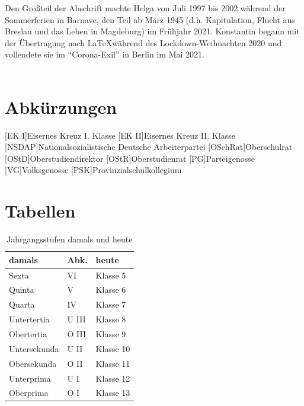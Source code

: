 \documentclass[a5paper,pagesize,10pt,twoside=true]{scrbook}
\begin{document}
Den Großteil der Abschrift machte Helga von Juli 1997 bis 2002 während der Sommerferien in Barnave, den Teil ab März 1945 (d.h. Kapitulation, Flucht aus Breslau und das Leben in Magdeburg) im Frühjahr 2021. Konstantin begann mit der Übertragung nach \LaTeX während des Lockdown-Weihnachten 2020 und vollendete sie im \enquote{Corona-Exil} in Berlin im Mai 2021.\\



 \leavevmode \\


\newpage
\appendix
{}
\section*{Abkürzungen}
\begin{acronym}
	[EK I]{Eisernes Kreuz I. Klasse}
	[EK II]{Eisernes Kreuz II. Klasse}
	[NSDAP]{Nationalsozialistische Deutsche Arbeiterpartei}
	[OSchRat]{Oberschulrat}
	[OStD]{Ober\-studien\-di\-rek\-tor}
	[OStR]{Oberstudienrat}
	[PG]{Parteigenosse}
	[VG]{Volksgenosse}
	[PSK]{Provinzialschulkollegium}
\end{acronym}

\newpage
\section*{Tabellen}
\begin{table}[h!]
	\label{tab:jahrgangsstufen}
	\centering
	\begin{tabular}{l|l||l}
		damals & Abk. & heute \\
		\hline
		Sexta & VI & Klasse 5 \\
		Quinta & V & Klasse 6 \\
		Quarta & IV & Klasse 7 \\
		Untertertia & U III & Klasse 8 \\
		Obertertia & O III & Klasse 9 \\
		Untersekunda & U II & Klasse 10 \\
		Obersekunda & O II & Klasse 11 \\
		Unterprima & U I & Klasse 12 \\
		Oberprima & O I & Klasse 13 \\
	\end{tabular}
	\caption{Jahrgangsstufen damals und heute}
\end{table}
\end{document}
